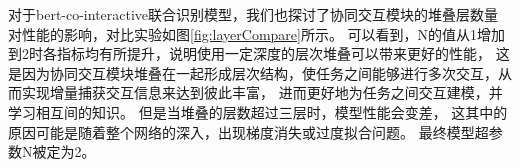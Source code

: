 对于bert-co-interactive联合识别模型，我们也探讨了协同交互模块的堆叠层数量对性能的影响，对比实验如图\ref{fig:layerCompare}所示。
可以看到，N的值从1增加到2时各指标均有所提升，说明使用一定深度的层次堆叠可以带来更好的性能，
这是因为协同交互模块堆叠在一起形成层次结构，使任务之间能够进行多次交互，从而实现增量捕获交互信息来达到彼此丰富，
进而更好地为任务之间交互建模，并学习相互间的知识。 
但是当堆叠的层数超过三层时，模型性能会变差，
这其中的原因可能是随着整个网络的深入，出现梯度消失或过度拟合问题。
最终模型超参数N被定为2。

\begin{figure}[htbp]
  \\
\end{figure}
